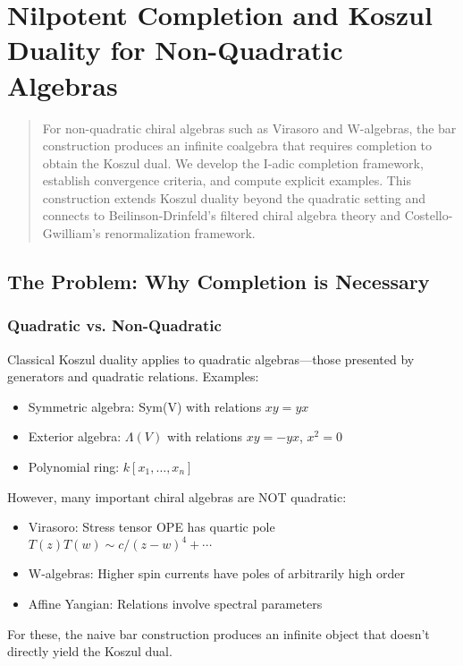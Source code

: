 
\chapter{Nilpotent Completion and Koszul Duality for Non-Quadratic Algebras}
\label{app:nilpotent-completion}

\begin{abstract}
For non-quadratic chiral algebras such as Virasoro and W-algebras, the bar construction produces an infinite coalgebra that requires completion to obtain the Koszul dual. We develop the I-adic completion framework, establish convergence criteria, and compute explicit examples. This construction extends Koszul duality beyond the quadratic setting and connects to Beilinson-Drinfeld's filtered chiral algebra theory and Costello-Gwilliam's renormalization framework.
\end{abstract}

\section{The Problem: Why Completion is Necessary}

\subsection{Quadratic vs. Non-Quadratic}

\begin{observation}\label{obs:quadratic-limitation}
Classical Koszul duality applies to quadratic algebras—those presented by generators and quadratic relations. Examples:
\begin{itemize}
\item Symmetric algebra: Sym(V) with relations $xy = yx$
\item Exterior algebra: $\Lambda(V)$ with relations $xy = -yx$, $x^2 = 0$
\item Polynomial ring: $k[x_1, \ldots, x_n]$
\end{itemize}

However, many important chiral algebras are NOT quadratic:
\begin{itemize}
\item Virasoro: Stress tensor OPE has quartic pole $T(z)T(w) \sim c/(z-w)^4 + \cdots$
\item W-algebras: Higher spin currents have poles of arbitrarily high order
\item Affine Yangian: Relations involve spectral parameters
\end{itemize}

For these, the naive bar construction produces an infinite object that doesn't directly yield the Koszul dual.
\end{observation}

